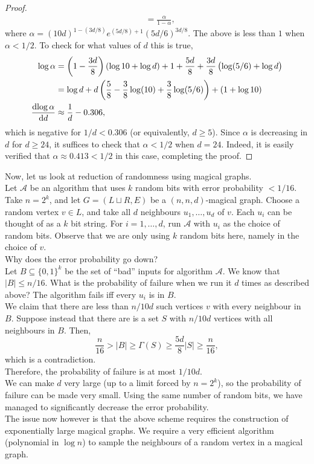 \begin{proof}
\begin{align*}
					&= \frac{\alpha}{1-\alpha},
			\end{align*}
			where $\alpha = (10d)^{1-(3d/8)} e^{(5d/8)+1} (5d/6)^{3d/8}$. The above is less than $1$ when $\alpha < 1/2$. To check for what values of $d$ this is true,
			\begin{align*}
				\log \alpha &= \left(1-\frac{3d}{8}\right)(\log 10 + \log d) + 1 + \frac{5d}{8} + \frac{3d}{8}\left(\log(5/6) + \log d\right) \\
					&= \log d + d \left( \frac{5}{8} - \frac{3}{8}\log(10) + \frac{3}{8}\log(5/6) \right) + (1+\log 10) \\
				\frac{\dif \log \alpha}{\dif d} &\approx \frac{1}{d} - 0.306,
			\end{align*}
			which is negative for $1/d < 0.306$ (or equivalently, $d \ge 5$). Since $\alpha$ is decreasing in $d$ for $d \ge 24$, it suffices to check that $\alpha < 1/2$ when $d=24$. Indeed, it is easily verified that $\alpha \approx 0.413 < 1/2$ in this case, completing the proof.
		\end{proof}

		Now, let us look at reduction of randomness using magical graphs.\\
		Let $\mathcal{A}$ be an algorithm that uses $k$ random bits with error probability $<1/16$. Take $n=2^k$, and let $G=(L\sqcup R,E)$ be a $(n,n,d)$-magical graph. Choose a random vertex $v\in L$, and take all $d$ neighbours $u_1,\ldots,u_d$ of $v$. Each $u_i$ can be thought of as a $k$ bit string. For $i=1,\ldots,d$, run $\mathcal{A}$ with $u_i$ as the choice of random bits. Observe that we are only using $k$ random bits here, namely in the choice of $v$.\\
		
		Why does the error probability go down?\\
		Let $B \subseteq \{0,1\}^k$ be the set of ``bad'' inputs for algorithm $\mathcal{A}$. We know that $|B| \le n/16$. What is the probability of failure when we run it $d$ times as described above? The algorithm fails iff every $u_i$ is in $B$.\\
		We claim that there are less than $n/10d$ such vertices $v$ with every neighbour in $B$. Suppose instead that there are is a set $S$ with $n/10d$ vertices with all neighbours in $B$. Then,
		\[ \frac{n}{16} > |B| \ge \Gamma(S) \ge \frac{5d}{8}|S| \ge \frac{n}{16}, \]
		which is a contradiction.\\
		Therefore, the probability of failure is at most $1/10d$.\\
		We can make $d$ very large (up to a limit forced by $n = 2^k$), so the probability of failure can be made very small. Using the same number of random bits, we have managed to significantly decrease the error probability.\\
		The issue now however is that the above scheme requires the construction of exponentially large magical graphs. We require a very efficient algorithm (polynomial in $\log n$) to sample the neighbours of a random vertex in a magical graph.

